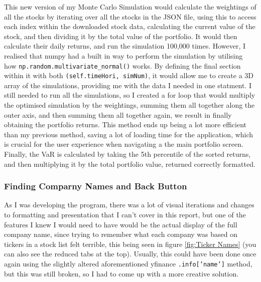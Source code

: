 \documentclass{article}
\begin{document}
\vspace{0.3cm}
This new version of my Monte Carlo Simulation would calculate the weightings of all the stocks by iterating over all the stocks in the JSON file, using this to access each index within the downloaded stock data, calculating the current value of the stock, and then dividing it by the total value of the portfolio. It would then calculate their daily returns, and run the simulation 100,000 times. However, I realised that numpy had a built in way to perform the simulation by utilising how \texttt{np.random.multivariate\_normal()} works. By defining the final section within it with both \texttt{(self.timeHori, simNum)}, it would allow me to create a 3D array of the simulations, providing me with the data I needed in one statment. I still needed to run all the simulations, so I created a for loop that would multiply the optimised simulation by the weightings, summing them all together along the outer axis, and then summing them all together again, we result in finally obtaining the portfolio returns. This method ends up being a lot more efficient than my previous method, saving a lot of loading time for the application, which is crucial for the user experience when navigating a the main portfolio screen. Finally, the VaR is calculated by taking the 5th percentile of the sorted returns, and then multiplying it by the total portfolio value, returned correctly formatted.\\\vspace{0.3cm}

\subsubsection{Finding Comparny Names and Back Button}
As I was developing the program, there was a lot of visual iterations and changes to formatting and presentation that I can't cover in this report, but one of the features I knew I would need to have would be the actual display of the full company name, since trying to remember what each company was based on tickers in a stock list felt terrible, this being seen in figure \ref{fig:Ticker Names} (you can also see the reduced tabs at the top). Usually, this could have been done once again using the slightly altered aforementioned yfinance \texttt{.info['name']} method, but this was still broken, so I had to come up with a more creative solution.\\\vspace{0.3cm}
\end{document}
